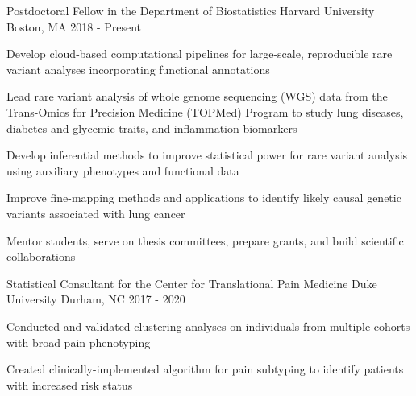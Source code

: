 

\begin{cventries}
\cventry
{Postdoctoral Fellow in the Department of Biostatistics} %
{Harvard University} %
{Boston, MA} %
{2018 - Present} %
{
	\begin{cvitems} %
		\item {Develop cloud-based computational pipelines for large-scale, reproducible rare variant analyses incorporating functional annotations}
		\item {Lead rare variant analysis of whole genome sequencing (WGS) data from the Trans-Omics for Precision Medicine (TOPMed) Program to study lung diseases, diabetes and glycemic traits, and inflammation biomarkers}
		\item {Develop inferential methods to improve statistical power for rare variant analysis using auxiliary phenotypes and functional data}
		\item {Improve fine-mapping methods and applications to identify likely causal genetic variants  associated with lung cancer}
		\item {Mentor students, serve on thesis committees, prepare grants, and build scientific collaborations}
	\end{cvitems}
}


  \cventry
    {Statistical Consultant for the Center for Translational Pain Medicine} %
    {Duke University} %
    {Durham, NC} %
    {2017 - 2020} %
    {
      \begin{cvitems} %
        \item {Conducted and validated clustering analyses on individuals from multiple cohorts with broad pain phenotyping}
        \item {Created clinically-implemented algorithm for pain subtyping to identify patients with increased risk status}
      \end{cvitems}
    }


\end{cventries}
